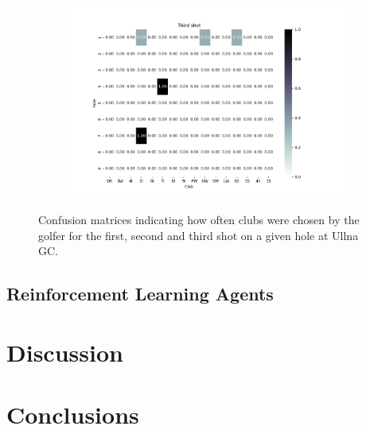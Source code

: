 \documentclass{kththesis}
\begin{document}
\begin{figure}
\begin{subfigure}{\textwidth}
    \includegraphics[height=0.3\textheight]{L2ClubChoices/Ludvig_Ullna_Club_Choices_Third_Shot.png} 
    \end{subfigure}
    \caption{Confusion matrices indicating how often clubs were chosen by the golfer for the first, second and third shot on a given hole at Ullna GC.}
    \label{fig:L2_ullna_club_choice_confusion}
\end{figure}

\section{Reinforcement Learning Agents}

\chapter{Discussion}


\chapter{Conclusions}


\printbibliography[heading=bibintoc]

\appendix
\end{document}
